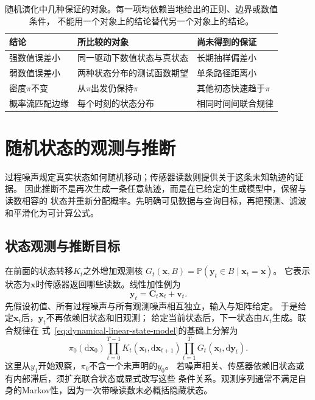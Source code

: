 \begin{table}[htbp]
 \centering
 \begin{tabularx}{\linewidth}{lXX}
 \toprule
 结论 & 所比较的对象 & 尚未得到的保证\\
 \midrule
 强数值误差小 & 同一驱动下数值状态与真状态 & 长期抽样偏差小\\
 弱数值误差小 & 两种状态分布的测试函数期望 & 单条路径距离小\\
 密度$\pi$不变 & 从$\pi$出发仍保持$\pi$ & 其他初态快速趋于$\pi$\\
 概率流匹配边缘 & 每个时刻的状态分布 & 相同时间间联合规律\\
 \bottomrule
 \end{tabularx}
 \caption{随机演化中几种保证的对象。每一项均依赖当地给出的正则、边界或数值条件，
 不能用一个对象上的结论替代另一个对象上的结论。}
 \label{tab:dynamical-path-distribution}
\end{table}

\section{随机状态的观测与推断}
\label{sec:dynamical-state-space-filtering}
\label{sec:dynamical-stochastic-state-observation}

过程噪声规定真实状态如何随机移动；传感器读数则提供关于这条未知轨迹的证据。
因此推断不是再次生成一条任意轨迹，而是在已给定的生成模型中，保留与读数相容的
状态并重新分配概率。先明确可见数据与查询目标，再把预测、滤波和平滑化为可计算公式。

\subsection{状态观测与推断目标}

在前面的状态转移$K_t$之外增加观测核
$G_t(\bm x,B)=\mathbb P(\bm y_t\in B\mid\bm x_t=\bm x)$。
它表示状态为$\bm x$时传感器返回哪些读数。线性加性例为
\begin{equation}
  \bm y_t=\bm C_t\bm x_t+\bm v_t.
  \label{eq:dynamical-linear-observation-model}
\end{equation}
先假设初值、所有过程噪声与所有观测噪声相互独立，输入与矩阵给定。
于是给定$\bm x_t$后，$\bm y_t$不再依赖旧状态和旧观测；
给定当前状态后，下一状态由$K_t$生成。联合规律在
式~\eqref{eq:dynamical-linear-state-model}的基础上分解为
\[
 \pi_0(\mathrm d\bm x_0)
       \prod_{t=0}^{T-1}K_t(\bm x_t,\mathrm d\bm x_{t+1})
       \prod_{t=1}^T G_t(\bm x_t,\mathrm d\bm y_t).
\]
这里从$y_1$开始观察，$\pi_0$不含一个未声明的$y_0$。
若噪声相关、传感器依赖旧状态或有内部滞后，须扩充联合状态或显式改写这些
条件关系。观测序列通常不满足自身的Markov性，因为一次带噪读数未必概括隐藏状态。

